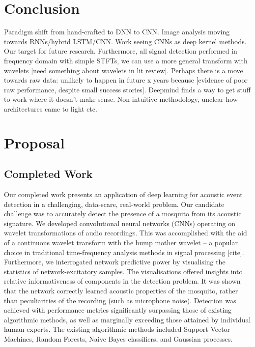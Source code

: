 \documentclass[12pt]{llncs}
\begin{document}






\section{Conclusion}
\label{sec:litreviewconclusion}
Paradigm shift from hand-crafted to DNN to CNN. Image analysis moving towards RNNs/hybrid LSTM/CNN. Work seeing CNNs as deep kernel methods. Our target for future research. Furthermore, all signal detection performed in frequency domain with simple STFTs, we can use a more general transform with wavelets [need something about wavelets in lit review]. Perhaps there is a move towards raw data: unlikely to happen in future x years because [evidence of poor raw performance, despite small success stories]. Deepmind finds a way to get stuff to work where it doesn't make sense. Non-intuitive methodology, unclear how architectures came to light etc.




\section{Proposal}
\label{sec:proposal}
\subsection{Completed Work}
Our completed work presents an application of deep learning for acoustic event detection in a challenging, data-scare, real-world problem. Our candidate challenge was to accurately detect the presence of a mosquito from its acoustic signature. We developed convolutional neural networks (CNNs) operating on wavelet transformations of audio recordings. This was accomplished with the aid of a continuous wavelet transform with the bump mother wavelet -- a popular choice in traditional time-frequency analysis methods in signal processing [cite]. Furthermore, we interrogated network predictive power by visualising the statistics of network-excitatory samples. The visualisations offered insights into relative informativeness of components in the detection problem. It was shown that the network correctly learned acoustic properties of the mosquito, rather than peculiarities of the recording (such as microphone noise). Detection was achieved with performance metrics significantly surpassing those of existing algorithmic methods, as well as marginally exceeding those attained by individual human experts. The existing algorithmic methods included Support Vector Machines, Random Forests, Naive Bayes classifiers, and Gaussian processes.
\end{document}
